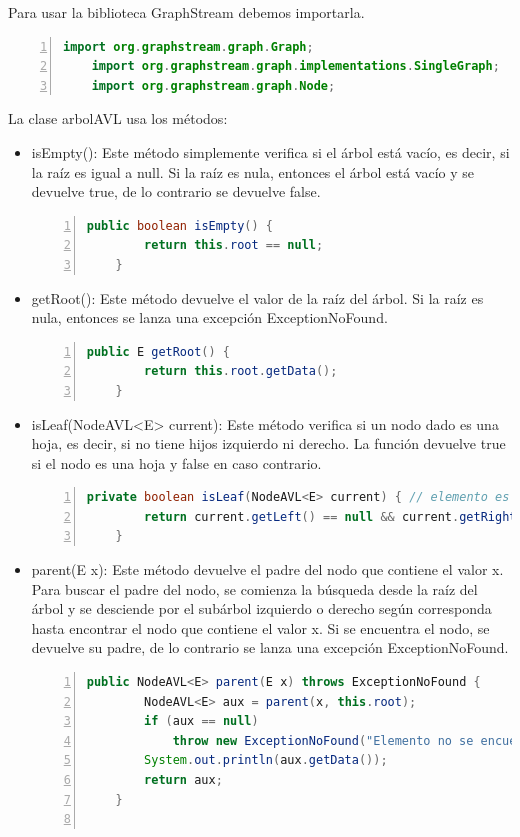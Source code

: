 \documentclass{article}
\begin{document}
                Para usar la biblioteca GraphStream debemos importarla.
                    \begin{lstlisting}[language=Java, caption=Método constructor arbolAVL()), numbers=left]
    import org.graphstream.graph.Graph;
    import org.graphstream.graph.implementations.SingleGraph;
    import org.graphstream.graph.Node;
                    \end{lstlisting}  
                
                La clase arbolAVL usa los métodos:
                \begin{itemize}
                    \item isEmpty(): Este método simplemente verifica si el árbol está vacío, es decir, si la raíz es igual a null. Si la raíz es nula, entonces el árbol está vacío y se devuelve true, de lo contrario se devuelve false.
                            \begin{lstlisting}[language=Java, caption=Método isEmpty(), numbers=left]
    public boolean isEmpty() {
        return this.root == null;
    }
                            \end{lstlisting}
                    \item getRoot(): Este método devuelve el valor de la raíz del árbol. Si la raíz es nula, entonces se lanza una excepción ExceptionNoFound.
                            \begin{lstlisting}[language=Java, caption=Método getRoot(), numbers=left]
    public E getRoot() {
        return this.root.getData();
    }
                            \end{lstlisting}
                    \item isLeaf(NodeAVL<E> current): Este método verifica si un nodo dado es una hoja, es decir, si no tiene hijos izquierdo ni derecho. La función devuelve true si el nodo es una hoja y false en caso contrario.
                            \begin{lstlisting}[language=Java, caption=Método isLeaf(NodeAVL<E> current), numbers=left]
    private boolean isLeaf(NodeAVL<E> current) { // elemento es hoja
        return current.getLeft() == null && current.getRight() == null;
    }
                            \end{lstlisting}
                    \item parent(E x): Este método devuelve el padre del nodo que contiene el valor x. Para buscar el padre del nodo, se comienza la búsqueda desde la raíz del árbol y se desciende por el subárbol izquierdo o derecho según corresponda hasta encontrar el nodo que contiene el valor x. Si se encuentra el nodo, se devuelve su padre, de lo contrario se lanza una excepción ExceptionNoFound.
                            \begin{lstlisting}[language=Java, caption=Método parent(E x), numbers=left]
    public NodeAVL<E> parent(E x) throws ExceptionNoFound {
        NodeAVL<E> aux = parent(x, this.root);
        if (aux == null)
            throw new ExceptionNoFound("Elemento no se encuentra en el arbol");
        System.out.println(aux.getData());
        return aux;
    }
    

\end{lstlisting}
\end{itemize}
\end{document}
